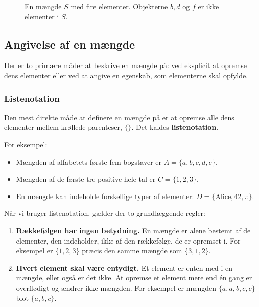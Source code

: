 \begin{figure}[htbp]
    \centering
    \caption{En mængde $S$ med fire elementer. Objekterne $b, d$ og $f$ er ikke elementer i $S$.}
    \label{fig:set_concept}
\end{figure}

\subsection*{Angivelse af en mængde}
Der er to primære måder at beskrive en mængde på: ved eksplicit at opremse dens elementer eller ved at angive en egenskab, som elementerne skal opfylde.

\subsubsection*{Listenotation}
Den mest direkte måde at definere en mængde på er at opremse alle dens elementer mellem krøllede parenteser, $\{ \}$. Det kaldes \textbf{listenotation}.

For eksempel:
\begin{itemize}
    \item Mængden af alfabetets første fem bogstaver er $A = \{a, b, c, d, e\}$.
    \item Mængden af de første tre positive hele tal er $C = \{1, 2, 3\}$.
    \item En mængde kan indeholde forskellige typer af elementer: $D = \{ \text{Alice}, 42, \pi \}$.
\end{itemize}

Når vi bruger listenotation, gælder der to grundlæggende regler:
\begin{enumerate}
    \item \textbf{Rækkefølgen har ingen betydning.} En mængde er alene bestemt af de elementer, den indeholder, ikke af den rækkefølge, de er opremset i. For eksempel er $\{1, 2, 3\}$ præcis den samme mængde som $\{3, 1, 2\}$.
    \item \textbf{Hvert element skal være entydigt.} Et element er enten med i en mængde, eller også er det ikke. At opremse et element mere end én gang er overflødigt og ændrer ikke mængden. For eksempel er mængden $\{a, a, b, c, c\}$ blot $\{a, b, c\}$.
\end{enumerate}


